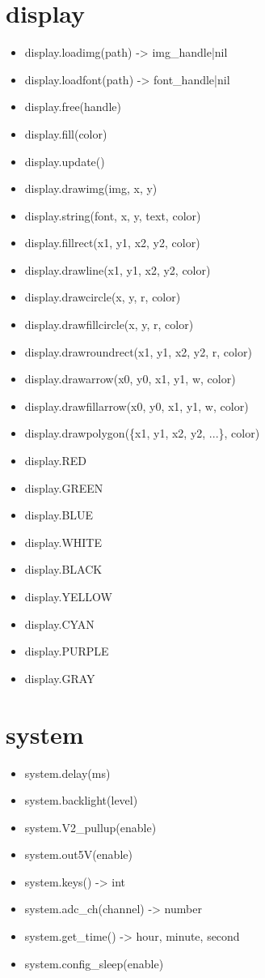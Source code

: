 \section{display}
\begin{itemize}
\item display.loadimg(path) -> img\_handle|nil
\item display.loadfont(path) -> font\_handle|nil
\item display.free(handle)
\item display.fill(color)
\item display.update()
\item display.drawimg(img, x, y)
\item display.string(font, x, y, text, color)
\item display.fillrect(x1, y1, x2, y2, color)
\item display.drawline(x1, y1, x2, y2, color)
\item display.drawcircle(x, y, r, color)
\item display.drawfillcircle(x, y, r, color)
\item display.drawroundrect(x1, y1, x2, y2, r, color)
\item display.drawarrow(x0, y0, x1, y1, w, color)
\item display.drawfillarrow(x0, y0, x1, y1, w, color)
\item display.drawpolygon(\{x1, y1, x2, y2, ...\}, color)
\item display.RED
\item display.GREEN
\item display.BLUE
\item display.WHITE
\item display.BLACK
\item display.YELLOW
\item display.CYAN
\item display.PURPLE
\item display.GRAY
\end{itemize}
\section{system}
\begin{itemize}
\item system.delay(ms)
\item system.backlight(level)
\item system.V2\_pullup(enable)
\item system.out5V(enable)
\item system.keys() -> int
\item system.adc\_ch(channel) -> number
\item system.get\_time() -> hour, minute, second
\item system.config\_sleep(enable)
\end{itemize}
